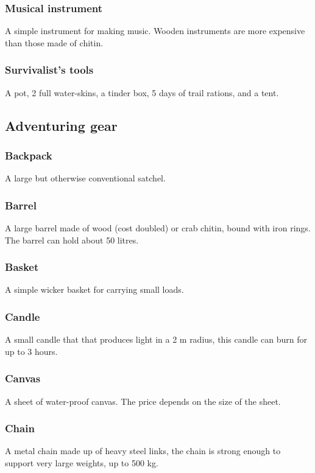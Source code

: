 \documentclass[a4paper,11pt,oneside]{book}
\newcommand{\textlf}[1]{\textbf{\titlecap{#1}}}
\begin{document}
\subsubsection{Musical instrument}
A simple instrument for making music. Wooden instruments are more expensive than those made of chitin.

\subsubsection{Survivalist's tools}
A pot, 2 full water-skins, a tinder box, 5 days of trail rations, and a tent.

\subsection{Adventuring gear}

\subsubsection{Backpack}
A large but otherwise conventional satchel.

\subsubsection{Barrel}
A large barrel made of wood (cost doubled) or crab chitin, bound with iron rings. The barrel can hold about 50 litres.

\subsubsection{Basket}
A simple wicker basket for carrying small loads.

\subsubsection{Candle}
A small candle that that produces \textlf{low} light in a 2 m radius, this candle can burn for up to 3 hours.

\subsubsection{Canvas}
A sheet of water-proof canvas. The price depends on the size of the sheet.

\subsubsection{Chain}
A metal chain made up of heavy steel links, the chain is strong enough to support very large weights, up to 500 kg.
\end{document}
